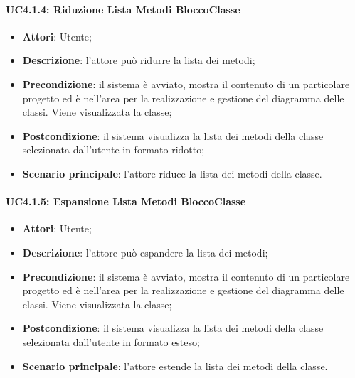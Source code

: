 \paragraph{UC4.1.4: Riduzione Lista Metodi BloccoClasse}
\label{UC4.1.4}
\begin{itemize}
	\item \textbf{Attori}: Utente;
	\item \textbf{Descrizione}: l'attore può ridurre la lista dei metodi;
	\item \textbf{Precondizione}: il sistema è avviato, mostra il contenuto di un particolare progetto ed è nell'area per la realizzazione e gestione del diagramma delle classi. Viene visualizzata la classe;
	\item \textbf{Postcondizione}: il sistema visualizza la lista dei metodi della classe selezionata dall'utente in formato ridotto;
	\item \textbf{Scenario principale}: l'attore riduce la lista dei metodi della classe.
\end{itemize}

\paragraph{UC4.1.5: Espansione Lista Metodi BloccoClasse}
\label{UC4.1.5}
\begin{itemize}
	\item \textbf{Attori}: Utente;
	\item \textbf{Descrizione}: l'attore può espandere la lista dei metodi;
	\item \textbf{Precondizione}: il sistema è avviato, mostra il contenuto di un particolare progetto ed è nell'area per la realizzazione e gestione del diagramma delle classi. Viene visualizzata la classe;
	\item \textbf{Postcondizione}: il sistema visualizza la lista dei metodi della classe selezionata dall'utente in formato esteso;
	\item \textbf{Scenario principale}: l'attore estende la lista dei metodi della classe.
\end{itemize}

